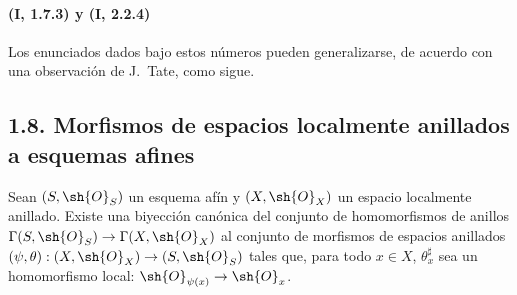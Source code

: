 \paragraph{(I, 1.7.3) y (I, 2.2.4)}
Los enunciados dados bajo estos números pueden generalizarse, de
acuerdo con una observación de J.~Tate, como sigue.

\subsection*{1.8. Morfismos de espacios localmente anillados a esquemas afines}
\label{ega2:addendum:subsection:I.1.8-fr}

\begin{proposition}[1.8.1]
\label{ega2:addendum:I.1.8.1-fr}
Sean $(S,\sh{O}_S)$ un esquema afín y $(X,\sh{O}_X)$ un espacio
localmente anillado. Existe una biyección canónica del conjunto de
homomorfismos de anillos
$\Gamma(S,\sh{O}_S)\to\Gamma(X,\sh{O}_X)$
al conjunto de morfismos de espacios anillados
$(\psi,\theta):(X,\sh{O}_X)\to(S,\sh{O}_S)$ tales que, para todo
$x\in X$, $\theta_x^\sharp$ sea un homomorfismo local: $\sh{O}_{\psi(x)}\to\sh{O}_x$.
\end{proposition}

